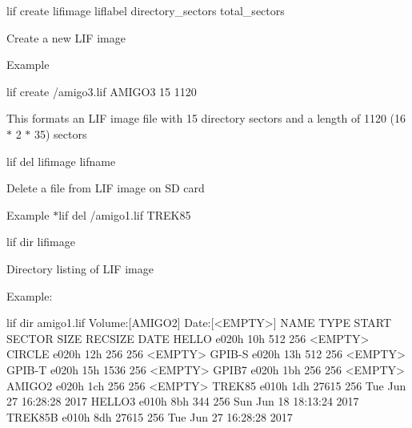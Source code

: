 \begin{DoxyItemize}
\begin{DoxyItemize}
\end{DoxyItemize}
\item lif create lifimage liflabel directory\+\_\+sectors total\+\_\+sectors
\begin{DoxyItemize}
\item Create a new L\+IF image
\item Example
\begin{DoxyItemize}
\item lif create /amigo3.lif A\+M\+I\+G\+O3 15 1120
\begin{DoxyItemize}
\item This formats an L\+IF image file with 15 directory sectors and a length of 1120 (16 $\ast$ 2 $\ast$ 35) sectors
\end{DoxyItemize}
\end{DoxyItemize}
\end{DoxyItemize}
\item lif del lifimage lifname
\begin{DoxyItemize}
\item Delete a file from L\+IF image on SD card
\item Example $\ast$lif del /amigo1.lif T\+R\+E\+K85
\end{DoxyItemize}
\item lif dir lifimage
\begin{DoxyItemize}
\item Directory listing of L\+IF image
\end{DoxyItemize}
\item Example\+: 
\begin{DoxyPre}
      lif dir amigo1.lif
      Volume:[AMIGO2] Date:[<EMPTY>]
      NAME         TYPE   START SECTOR        SIZE    RECSIZE   DATE
      HELLO       e020h            10h         512        256   <EMPTY>
      CIRCLE      e020h            12h         256        256   <EMPTY>
      GPIB-S      e020h            13h         512        256   <EMPTY>
      GPIB-T      e020h            15h        1536        256   <EMPTY>
      GPIB7       e020h            1bh         256        256   <EMPTY>
      AMIGO2      e020h            1ch         256        256   <EMPTY>
      TREK85      e010h            1dh       27615        256   Tue Jun 27 16:28:28 2017
      HELLO3      e010h            8bh         344        256   Sun Jun 18 18:13:24 2017
      TREK85B     e010h            8dh       27615        256   Tue Jun 27 16:28:28 2017\end{DoxyPre}




\end{DoxyItemize}
